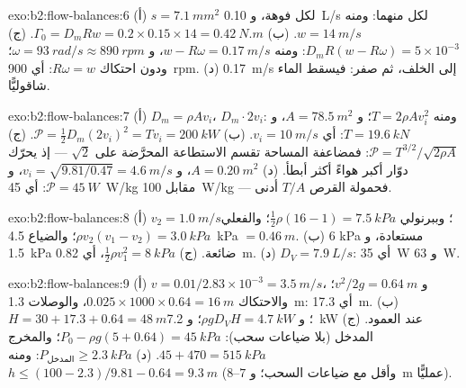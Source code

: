 \begin{solution}{exo:b2:flow-balances:6}
(أ) $s = \qty{7.1}{mm^2}$ لكل فوهة، و \qty{0.10}{L/s} لكل منهما: ومنه $w = \qty{14}{m/s}$. (ب)
$\Gamma_0 = D_mRw = 0.2 \times 0.15 \times 14 = \qty{0.42}{N.m}$. (ج) $D_mR(w - R\omega) =
5 \times 10^{-3}$: ومنه $w - R\omega = \qty{0.17}{m/s}$، و $\omega = \qty{93}{rad/s} \approx \qty{890}{rpm}$؛
ودون احتكاك $R\omega = w$: أي \qty{900}{rpm}. (د) \qty{0.17}{m/s} إلى الخلف، ثم
صفر: فيسقط الماء شاقوليًّا.
\end{solution}

\begin{solution}{exo:b2:flow-balances:7}
(أ) $D_m = \rho Av_i$،  $D_m\cdot2v_i$: ومنه $T = 2\rho Av_i^2$؛ و $A = \qty{78.5}{m^2}$،
و $T = \qty{19.6}{kN}$: أي $v_i = \qty{10}{m/s}$. (ب) $\mathcal P = \tfrac12D_m(2v_i)^2 = Tv_i =
\qty{200}{kW}$. (ج) $\mathcal P = T^{3/2}/\sqrt{2\rho A}$: فمضاعفة المساحة
تقسم الاستطاعة المحرَّضة على $\sqrt2$ --- إذ يحرّك دوّار أكبر هواءً أكثر
أبطأ. (د) $A = \qty{0.20}{m^2}$، و $v_i = \sqrt{9.81/0.47} = \qty{4.6}{m/s}$، و $\mathcal P
= \qty{45}{W}$: أي \qty{45}{W/kg} مقابل \qty{100}{W/kg} --- فحمولة القرص $T/A$
أدنى.
\end{solution}

\begin{solution}{exo:b2:flow-balances:8}
(أ) $v_2 = \qty{1.0}{m/s}$؛ وببرنولي $\tfrac12\rho(16 - 1) = \qty{7.5}{kPa}$؛ والفعلي
$\rho v_2(v_1 - v_2) = \qty{3.0}{kPa}$؛ والضياع \qty{4.5}{kPa} $= \qty{0.46}{m}$. (ب) $6$ kPa
مستعادة، و \qty{1.5}{kPa} ضائعة. (ج) $\tfrac12\rho v_1^2 = \qty{8}{kPa}$، أي \qty{0.82}{m}. (د)
$D_V = \qty{7.9}{L/s}$: أي \qty{35}{W} و \qty{63}{W}.
\end{solution}

\begin{solution}{exo:b2:flow-balances:9}
(أ) $v = 0.01/2.83 \times 10^{-3} = \qty{3.5}{m/s}$، و $v^2/2g = \qty{0.64}{m}$؛ والاحتكاك
$0.025 \times 1000 \times 0.64 = \qty{16}{m}$، والوصلات \qty{1.3}{m}: أي \qty{17.3}{m}. (ب)
$H = 30 + 17.3 + 0.64 = \qty{48}{m}$؛ و $\rho gD_VH = \qty{4.7}{kW}$؛ و \qty{7.2}{kW} عند
العمود. (ج) المدخل (بلا ضياعات سحب): $P_0 - \rho g(5 + 0.64) = \qty{45}{kPa}$؛
والمخرج $45 + 470 = \qty{515}{kPa}$. (د) $P_{\text{المدخل}} \ge \qty{2.3}{kPa}$: ومنه $h \le (100 -
2.3)/9.81 - 0.64 = \qty{9.3}{m}$ (وأقل مع ضياعات السحب؛ و $7$--\qty{8}{m}
عمليًّا).
\end{solution}

